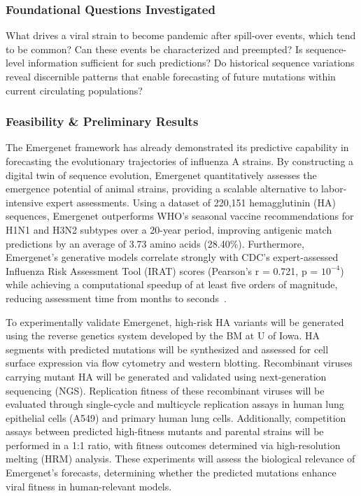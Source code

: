 \documentclass[onecolumn, compsoc,11pt]{IEEEtran}
\begin{document}
\subsubsection*{Foundational Questions Investigated} What drives a viral strain to become pandemic after spill-over events, which tend to be common? Can these events be characterized and preempted? Is sequence-level information sufficient for such predictions? Do historical sequence variations reveal discernible patterns that enable forecasting of future mutations within current circulating populations?

\subsubsection*{Feasibility \& Preliminary Results}
The Emergenet framework has already demonstrated its predictive capability in forecasting the evolutionary trajectories of influenza A strains. By constructing a digital twin of sequence evolution, Emergenet quantitatively assesses the emergence potential of animal strains, providing a scalable alternative to labor-intensive expert assessments. Using a dataset of 220,151 hemagglutinin (HA) sequences, Emergenet outperforms WHO’s seasonal vaccine recommendations for H1N1 and H3N2 subtypes over a 20-year period, improving antigenic match predictions by an average of 3.73 amino acids (28.40\%). Furthermore, Emergenet’s generative models correlate strongly with CDC’s expert-assessed Influenza Risk Assessment Tool (IRAT) scores (Pearson’s r = 0.721, p = $10^{-4}$) while achieving a computational speedup of at least five orders of magnitude, reducing assessment time from months to seconds~\cite{wu2024emergenet}.

\lhead{}

To experimentally validate Emergenet, high-risk HA variants will be generated using the reverse genetics system developed by the BM at U of Iowa. HA segments with predicted mutations will be synthesized and assessed for cell surface expression via flow cytometry and western blotting. Recombinant viruses carrying mutant HA will be generated and validated using next-generation sequencing (NGS). Replication fitness of these recombinant viruses will be evaluated through single-cycle and multicycle replication assays in human lung epithelial cells (A549) and primary human lung cells. Additionally, competition assays between predicted high-fitness mutants and parental strains will be performed in a 1:1 ratio, with fitness outcomes determined via high-resolution melting (HRM) analysis. These experiments will assess the biological relevance of Emergenet’s forecasts, determining whether the predicted mutations enhance viral fitness in human-relevant models.
\end{document}
